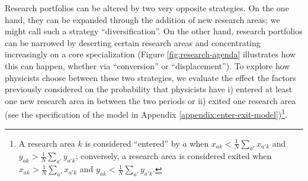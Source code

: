 \documentclass{article}
\begin{document}
Research portfolios can be altered by two very opposite strategies. On the one hand, they can be expanded through the addition of new research areas; we might call such a strategy ``diversification''. On the other hand, research portfolios can be narrowed by deserting certain research areas and concentrating increasingly on a core specialization (Figure \ref{fig:research-agenda} illustrates how this can happen, whether via ``conversion'' or ``displacement''). To explore how physicists choose between these two strategies, we evaluate the effect the factors previously considered on the probability that physicists have i) entered at least one new research area in between the two periods or ii) exited one research area (see the specification of the model in Appendix \ref{appendix:enter-exit-model})\footnote{A research area $k$ is considered ``entered'' by $a$ when $x_{ak}<\frac{1}{N}\sum_{a'}x_{a'k}$ and $y_{ak}>\frac{1}{N}\sum_{a'}y_{a'k}$; conversely, a research area is considered exited when $x_{ak}>\frac{1}{N}\sum_{a'}x_{a'k}$ and $y_{ak}<\frac{1}{N}\sum_{a'}y_{a'k}$.}.
\end{document}
